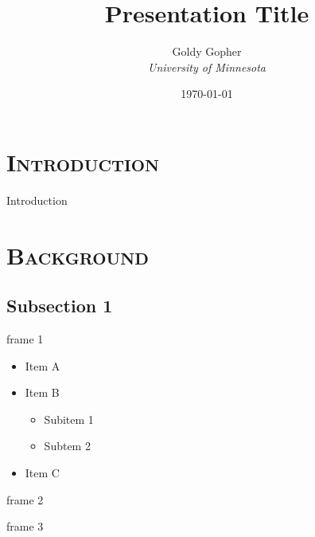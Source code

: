 \documentclass[xcolor=x11names,compress]{beamer}
\begin{document}
\title{Presentation Title}
\author{
  Goldy Gopher\\
  {\it University of Minnesota}\\
}
\date{\today}

{%
  \begin{frame}
    \titlepage
  \end{frame}
}

\section{\scshape Introduction}
\begin{frame}{Introduction}
\tableofcontents
\end{frame}

\section{\scshape Background}
\subsection{Subsection 1}
\begin{frame}{frame 1}
\begin{itemize}
\item Item A
\item Item B
\begin{itemize}
\item Subitem 1
\item Subtem 2
\end{itemize}
\item Item C
\end{itemize}
\end{frame}

\begin{frame}{frame 2}

\end{frame}

\begin{frame}{frame 3}

\end{frame}
\end{document}
